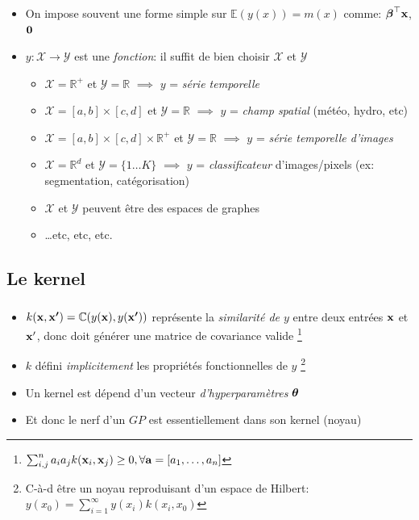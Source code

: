 \documentclass[xcolor=svgnames, t]{beamer}
\newcommand{\vectorx}[1]{\boldsymbol{\MakeLowercase{\mathbf{#1}}}}
\newcommand{\coloredemph}[1]{\textcolor{internationalblue}{\emph{#1}}}
\begin{document}
\begin{frame}
  \frametitle{\secname}
  \begin{itemize}
    \item On impose souvent une forme simple sur $\mathbb{E}(y(x)) = m(x)$ 
    comme: $\vectorx{\beta}^\top \vectorx{x}$, $\vectorx{0}$
    \pause
    \item $y: \mathcal{X} \to \mathcal{Y}$ est une \coloredemph{fonction}: il suffit de bien choisir $\mathcal{X}$ et $\mathcal{Y}$
    \begin{itemize}
      \item $\mathcal{X} = \mathbb{R}^{+}$ et $\mathcal{Y} = \mathbb{R}$ $\implies$
      $y$ = \coloredemph{série temporelle}
      \pause
      \item $\mathcal{X} = [a, b] \times [c, d]$ et  $\mathcal{Y} = \mathbb{R}$ $\implies$
      $y$ = \coloredemph{champ spatial} (météo, hydro, etc)
      \pause
      \item $\mathcal{X} = [a, b] \times [c, d] \times \mathbb{R}^{+}$ et $\mathcal{Y} = \mathbb{R}$ $\implies$
      $y$ = \coloredemph{série temporelle d'images}
      \pause
      \item $\mathcal{X} = \mathbb{R}^{d}$ et $\mathcal{Y} = \{1 \dots K \}$ $\implies$
      $y$ = \coloredemph{classificateur} d'images/pixels (ex: segmentation, catégorisation)
      \item $\mathcal{X}$ et $\mathcal{Y}$ peuvent être des espaces de graphes
      \item \dots etc, etc, etc.
    \end{itemize}
  \end{itemize}
\end{frame}

\subsection{Le kernel}
\begin{frame}
  \frametitle{\secname}
  \begin{itemize}
    \item $k(\vectorx{x}, \vectorx{x^{\prime}}) = \mathbb{C}( y(\vectorx{x}), y(\vectorx{x^\prime}) )$
     représente la \coloredemph{similarité de $y$} entre deux entrées $\vectorx{x}$ et $\vectorx{x}^\prime$,
     donc doit générer une matrice de covariance valide
     \footnote{
      $\sum_{i,j}^{n} a_i a_j k(\vectorx{x}_i, \vectorx{x}_j) \geq 0, \forall \vectorx{a} = [a_1, \dots, a_n]$
    }
    \pause
    \item $k$ défini \coloredemph{implicitement} les propriétés fonctionnelles de $y$
    \footnote{
      C-à-d être un noyau reproduisant d'un espace de Hilbert:
      $y(x_0) = \sum_{i=1}^{\infty} y(x_i) k(x_i, x_0)$ 
    }
    \pause
    \item Un kernel est dépend d'un vecteur \coloredemph{d'hyperparamètres} $\vectorx{\theta}$
    \pause
    \item Et donc le nerf d'un $GP$ est essentiellement dans son kernel (noyau)
  \end{itemize}
\end{frame}
\end{document}
